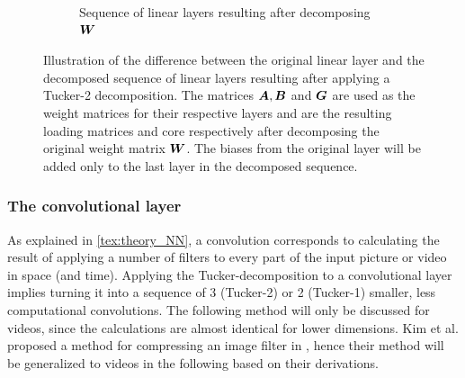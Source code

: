 \begin{figure}
\begin{subfigure}{\linewidth}
        \caption{Sequence of linear layers resulting after decomposing $\boldsymbol{W}$}
    \end{subfigure}
    \captionsetup{width=.95\linewidth}
    \caption{Illustration of the difference between the original linear layer and the decomposed sequence of linear layers resulting after applying a Tucker-2 decomposition. The matrices $\boldsymbol{A}, \boldsymbol{B}$ and $\boldsymbol{G}$ are used as the weight matrices for their respective layers and are the resulting loading matrices and core respectively after decomposing the original weight matrix $\boldsymbol{W}$. The biases from the original layer will be added only to the last layer in the decomposed sequence.}
    \label{fig:diffNNlinearLayer}
\end{figure}

\subsubsection{The convolutional layer}
As explained in \autoref{tex:theory_NN}, a convolution corresponds to calculating the result of applying a number of filters to every part of the input picture or video in space (and time). Applying the Tucker-decomposition to a convolutional layer implies turning it into a sequence of 3 (Tucker-2) or 2 (Tucker-1) smaller, less computational convolutions. The following method will only be discussed for videos, since the calculations are almost identical for lower dimensions. Kim et al. proposed a method for compressing an image filter in \cite{Kim2016}, hence their method will be generalized to videos in the following based on their derivations.

